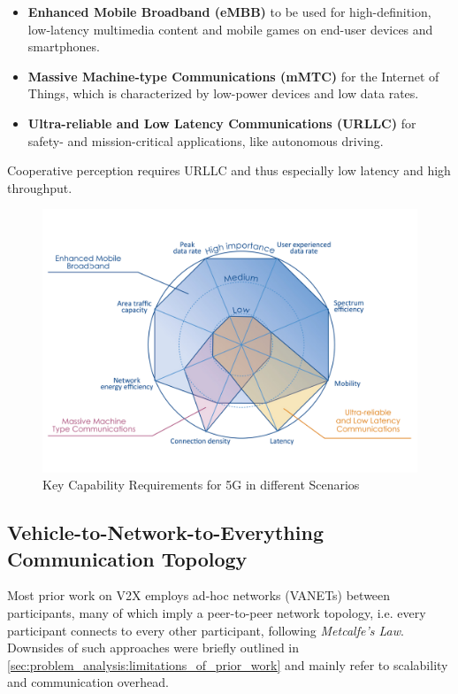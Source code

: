 \begin{itemize}
	\item \textbf{Enhanced Mobile Broadband (eMBB)} to be used for high-definition, low-latency multimedia content and mobile games on end-user devices and smartphones.
	\item \textbf{Massive Machine-type Communications (mMTC)} for the Internet of Things, which is characterized by low-power devices and low data rates.
	\item \textbf{Ultra-reliable and Low Latency Communications (URLLC)} for safety- and mission-critical applications, like autonomous driving. 
\end{itemize}

Cooperative perception requires URLLC and thus especially low latency and high throughput.

\begin{figure}[h]
	\centering
	\includegraphics[width=0.75\linewidth]{98_images/5g_spider_chart}
	\caption[Key Capability Requirements for 5G]{Key Capability Requirements for 5G in different Scenarios \cite{ETSI5G}}
	\label{fig:5g_capabilities}
\end{figure}

\subsection{Vehicle-to-Network-to-Everything Communication Topology}
\label{subsec:concept_design:communication_topology}
Most prior work on V2X employs ad-hoc networks (VANETs) between participants, many of which imply a peer-to-peer network topology, i.e. every participant connects to every other participant, following \textit{Metcalfe's Law}. Downsides of such approaches were briefly outlined in \cref{sec:problem_analysis:limitations_of_prior_work} and mainly refer to scalability and communication overhead.

